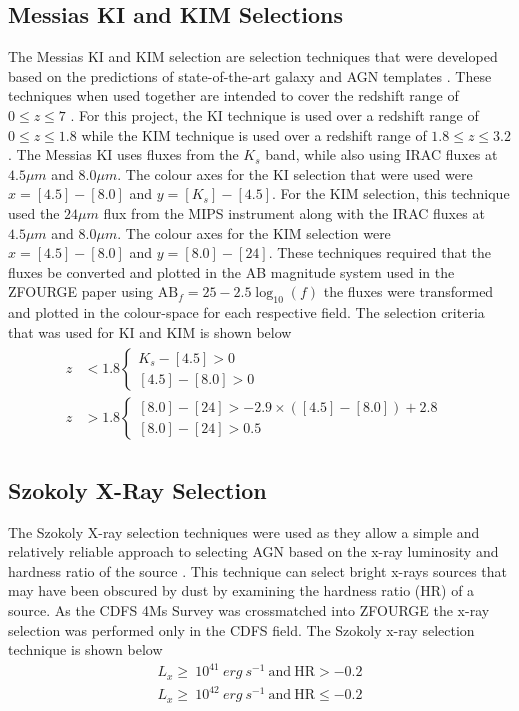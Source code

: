 \documentclass[12pt]{iopart}
\begin{document}
\subsection{Messias KI and KIM Selections}
The Messias KI and KIM selection are selection techniques that were developed based on the predictions of state-of-the-art galaxy and AGN templates \cite{messias_new_2012}. These techniques when used together are intended to cover the redshift range of $0 \leq z \leq 7$ \cite{messias_new_2012}. For this project, the KI technique is used over a redshift range of $0 \leq z \leq 1.8$ while the KIM technique is used over a redshift range of $1.8 \leq z \leq 3.2$. The Messias KI uses fluxes from the $K_s$ band, while also using IRAC fluxes at $4.5\mu m$ and $8.0\mu m$. The colour axes for the KI selection that were used were $x = [4.5] - [8.0]$ and $y = [K_s] - [4.5]$. For the KIM selection, this technique used the $24\mu m$ flux from the MIPS instrument along with the IRAC fluxes at $4.5\mu m$ and $8.0\mu m$. The colour axes for the KIM selection were $x = [4.5] - [8.0]$ and $y = [8.0] - [24]$. These techniques required that the fluxes be converted and plotted in the AB magnitude system used in the ZFOURGE paper \cite{straatman_fourstar_2016} using $\text{AB}_f =25-2.5\log_{10} \left( f \right)$ the fluxes were transformed and plotted in the colour-space for each respective field. The selection criteria that was used for KI and KIM is shown below
\begin{align*}
    \begin{split}
        z&<1.8\begin{cases}K_{s}-[4.5]>0&\\ [4.5]-[8.0]>0&\end{cases} \\
        z&>1.8\begin{cases}[8.0]-[24]>-2.9\times ([4.5]-[8.0])+2.8&\\ [8.0]-[24]>0.5&\end{cases}
    \end{split}
\end{align*}
\subsection{Szokoly X-Ray Selection}
The Szokoly X-ray selection techniques were used as they allow a simple and relatively reliable approach to selecting AGN based on the x-ray luminosity and hardness ratio of the source \cite{szokoly_chandra_2004}. This technique can select bright x-rays sources that may have been obscured by dust by examining the hardness ratio (HR) of a source. As the CDFS 4Ms Survey was crossmatched into ZFOURGE the x-ray selection was performed only in the CDFS field. The Szokoly x-ray selection technique is shown below
\begin{align*}
    L_x \geq \ 10^{41}\ erg\ s^{-1}\ \text{and}\ \text{HR} > -0.2 \\
    L_x \geq \ 10^{42}\ erg\ s^{-1}\ \text{and}\  \text{HR} \leq -0.2
\end{align*}
\end{document}
